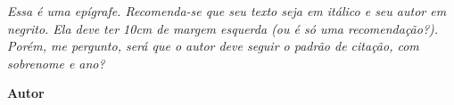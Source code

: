 \vspace*{\fill}

\begin{epigrafe}
    \textit{Essa é uma epígrafe. Recomenda-se que seu texto seja em itálico e seu autor em negrito. Ela deve ter 10cm de margem esquerda (ou é só uma recomendação?). Porém, me pergunto, será que o autor deve seguir o padrão de citação, com sobrenome e ano?} 
    
    \textbf{Autor}
\end{epigrafe}

\OnesideTwoside{\clearpage}{\cleardoublepage}